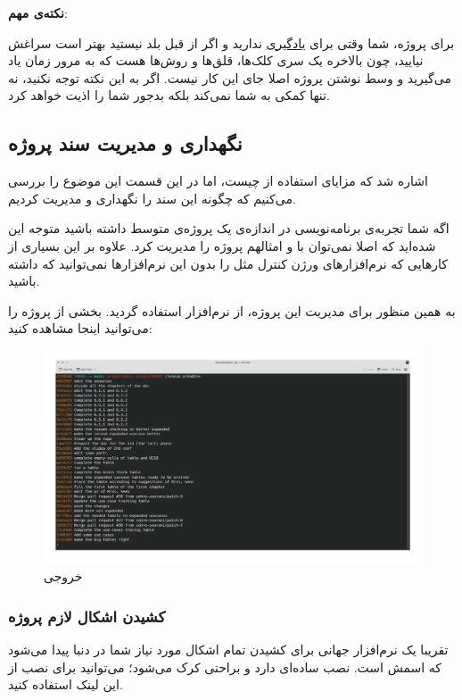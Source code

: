   \textbf{نکته‌ی مهم}:
  
  برای پروژه، شما وقتی برای \underline{یادگیری} \lr{\LaTeX } ندارید و اگر از قبل بلد نیستید بهتر است سراغش نیایید، چون بالاخره یک سری کلک‌ها، قلق‌ها و روش‌ها هست که به مرور زمان یاد می‌گیرید و وسط نوشتن پروژه اصلا جای این کار نیست. اگر به این نکته توجه نکنید، نه تنها \lr{\LaTeX } کمکی به شما نمی‌کند بلکه بدجور شما را اذیت خواهد کرد.

\subsection{نگهداری و مدیریت سند پروژه}
اشاره شد که مزایای استفاده از \lr{\LaTeX } چیست، اما در این قسمت این موضوع را بررسی می‌کنیم که چگونه این سند را نگهداری و مدیریت کردیم.

اگه شما تجربه‌ی برنامه‌نویسی در اندازه‌ی یک پروژه‌‌ی متوسط داشته باشید متوجه این شده‌‌اید که اصلا نمی‌توان با  و امثالهم پروژه را مدیریت کرد. علاوه بر این بسیاری از کار‌هایی که نرم‌افزار‌‌های ورژن کنترل مثل  را بدون این نرم‌افزار‌ها نمی‌توانید که داشته باشید.

به همین منظور برای مدیریت 
 این پروژه‌، از نرم‌افزار  استفاده گردید.
 بخشی از  پروژه را می‌توانید اینجا مشاهده کنید:
 \begin{figure}[H]
 	\caption{خروجی }
 	\begin{center}
 		\includegraphics[angle=90, width=\textwidth, height=\textheight]{./images/log}
 	\end{center}
 \end{figure}

\subsubsection{کشیدن اشکال لازم پروژه}
تقریبا یک نرم‌افزار جهانی برای کشیدن تمام اشکال مورد نیاز شما در دنبا پیدا می‌شود که اسمش  است.
نصب ساده‌ای دارد و براحتی کرک می‌شود؛ می‌توانید برای نصب از این لینک  استفاده کنید.
 
